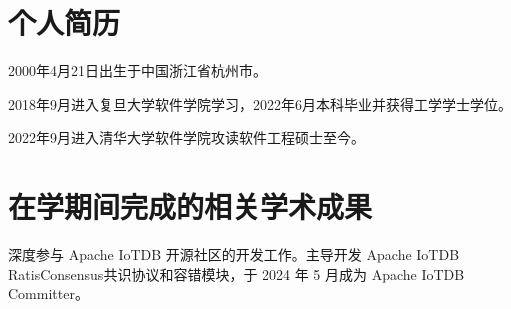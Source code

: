 
\begin{resume}

  \section*{个人简历}

  2000年4月21日出生于中国浙江省杭州市。

  2018年9月进入复旦大学软件学院学习，2022年6月本科毕业并获得工学学士学位。

  2022年9月进入清华大学软件学院攻读软件工程硕士至今。


  \section*{在学期间完成的相关学术成果}

  深度参与 Apache IoTDB 开源社区的开发工作。主导开发 Apache IoTDB RatisConsensus共识协议和容错模块，于 2024 年 5 月成为 Apache IoTDB Committer。






\end{resume}
